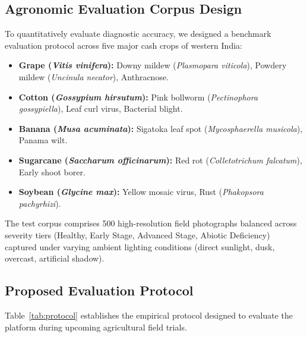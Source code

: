 \documentclass[conference]{IEEEtran}
\begin{document}
\subsection{Agronomic Evaluation Corpus Design}
To quantitatively evaluate diagnostic accuracy, we designed a benchmark evaluation protocol across five major cash crops of western India:
\begin{itemize}
    \item \textbf{Grape (\textit{Vitis vinifera}):} Downy mildew (\textit{Plasmopara viticola}), Powdery mildew (\textit{Uncinula necator}), Anthracnose.
    \item \textbf{Cotton (\textit{Gossypium hirsutum}):} Pink bollworm (\textit{Pectinophora gossypiella}), Leaf curl virus, Bacterial blight.
    \item \textbf{Banana (\textit{Musa acuminata}):} Sigatoka leaf spot (\textit{Mycosphaerella musicola}), Panama wilt.
    \item \textbf{Sugarcane (\textit{Saccharum officinarum}):} Red rot (\textit{Colletotrichum falcatum}), Early shoot borer.
    \item \textbf{Soybean (\textit{Glycine max}):} Yellow mosaic virus, Rust (\textit{Phakopsora pachyrhizi}).
\end{itemize}

The test corpus comprises 500 high-resolution field photographs balanced across severity tiers (Healthy, Early Stage, Advanced Stage, Abiotic Deficiency) captured under varying ambient lighting conditions (direct sunlight, dusk, overcast, artificial shadow).

\subsection{Proposed Evaluation Protocol}
Table~\ref{tab:protocol} establishes the empirical protocol designed to evaluate the platform during upcoming agricultural field trials.
\end{document}
